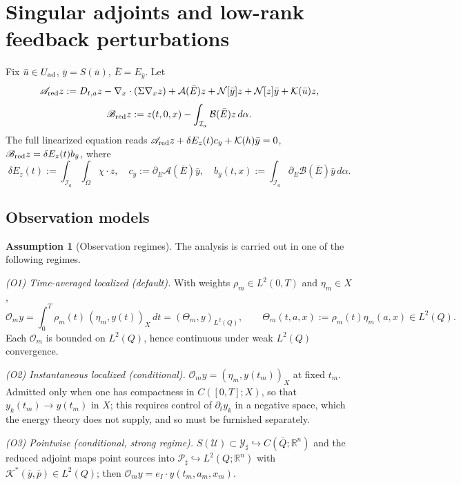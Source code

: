 \documentclass[pdflatex,sn-mathphys-num]{sn-jnl}
\theoremstyle{plain}
\theoremstyle{definition}
\newtheorem{assumption}[theorem]{Assumption}
\theoremstyle{remark}
\newcommand{\R}{\mathbb R}
\begin{document}
\section{Singular adjoints and low-rank feedback perturbations}
\label{sec:singular-adjoint-feedback}
Fix $\bar u\in U_{\rm ad}$, $\bar y=S(\bar u)$, $\bar E=E_{\bar y}$. Let
\[
\mathscr A_{\rm red}z
:=
D_{t,a}z
-\nabla_x\cdot(\Sigma\nabla_x z)
+
\mathcal A(\bar E)z
+
\mathcal N[\bar y]z
+
\mathcal N[z]\bar y
+
\mathcal K(\bar u)z ,
\]
\[
\mathscr B_{\rm red}z
:=
z(t,0,x)
-
\int_{\mathcal I_a}
\mathcal B(\bar E)z\,d\alpha .
\]
The full linearized equation reads $\mathscr A_{\rm red}z+\delta E_z(t)
c_{\bar y}+\mathcal K(h)\bar y=0$, $\mathscr B_{\rm red}z=\delta E_z(t)
b_{\bar y}$, where
\[
\delta E_z(t):=\int_{\mathcal I_a}\int_\Omega\chi\cdot z,
\quad
c_{\bar y}:=\partial_E\mathcal A(\bar E)\bar y,
\quad
b_{\bar y}(t,x):=\int_{\mathcal I_a}\partial_E\mathcal B(\bar E)\bar y\,d\alpha .
\]

\subsection{Observation models}
\label{subsec:observation-models}
\begin{assumption}[Observation regimes]
\label{ass:observation-regimes}
The analysis is carried out in one of the following regimes.

\emph{(O1) Time-averaged localized (default).} With weights
$\rho_m\in L^2(0,T)$ and $\eta_m\in X$,
\[
\mathcal O_m y
=
\int_0^T\rho_m(t)\,(\eta_m,y(t))_X\,dt
=
(\Theta_m,y)_{L^2(Q)},
\qquad
\Theta_m(t,a,x):=\rho_m(t)\eta_m(a,x)\in L^2(Q).
\]
Each $\mathcal O_m$ is bounded on $L^2(Q)$, hence continuous under weak
$L^2(Q)$ convergence.

\emph{(O2) Instantaneous localized (conditional).} $\mathcal O_m
y=(\eta_m,y(t_m))_X$ at fixed $t_m$. Admitted only when one has compactness in
$C([0,T];X)$, so that $y_k(t_m)\to y(t_m)$ in $X$; this requires control of
$\partial_t y_k$ in a negative space, which the energy theory does not supply,
and so must be furnished separately.

\emph{(O3) Pointwise (conditional, strong regime).} $S(\mathcal U)\subset
\mathcal Y_\sharp\hookrightarrow C(\overline Q;\R^n)$ and the reduced adjoint
maps point sources into $\mathcal P_\sharp\hookrightarrow L^2(Q;\R^n)$ with
$\mathcal K^*(\bar y,\bar p)\in L^2(Q)$; then
$\mathcal O_m y=e_I\cdot y(t_m,a_m,x_m)$.
\end{assumption}
\end{document}
